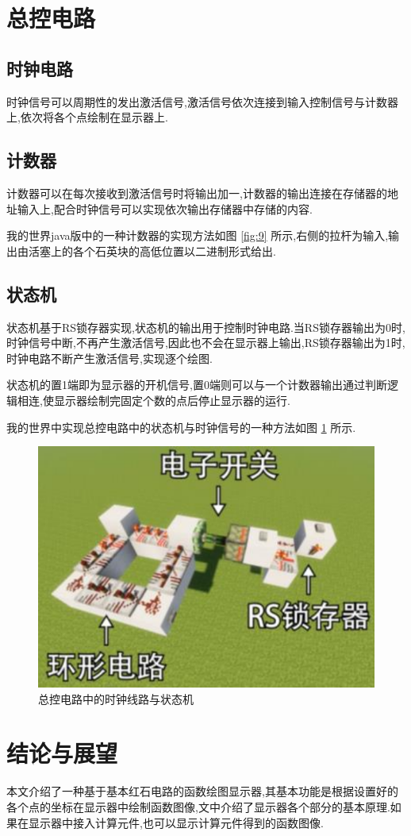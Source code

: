 \documentclass[UTF8,12pt,punct=kaiming,fontset=none]{ctexart}
\begin{document}
    \section{总控电路}
    \subsection{时钟电路}
    时钟信号可以周期性的发出激活信号,激活信号依次连接到输入控制信号与计数器上,依次将各个点绘制在显示器上.

    \subsection{计数器}
    计数器可以在每次接收到激活信号时将输出加一,计数器的输出连接在存储器的地址输入上,配合时钟信号可以实现依次输出存储器中存储的内容.
    
    我的世界java版中的一种计数器的实现方法如图 \ref{fig:9} 所示,右侧的拉杆为输入,输出由活塞上的各个石英块的高低位置以二进制形式给出.

    \subsection{状态机}
    状态机基于RS锁存器实现,状态机的输出用于控制时钟电路.当RS锁存器输出为0时,时钟信号中断,不再产生激活信号,因此也不会在显示器上输出,RS锁存器输出为1时,时钟电路不断产生激活信号,实现逐个绘图.
    
    状态机的置1端即为显示器的开机信号,置0端则可以与一个计数器输出通过判断逻辑相连,使显示器绘制完固定个数的点后停止显示器的运行.
    
    我的世界中实现总控电路中的状态机与时钟信号的一种方法如图 \ref{fig:10} 所示.

    \begin{figure}[H]
        \centering
        \includegraphics[width=0.25\linewidth]{figures/10.png}
        \caption{总控电路中的时钟线路与状态机}
        \label{fig:10}
    \end{figure}

    \section{结论与展望}
    本文介绍了一种基于基本红石电路的函数绘图显示器,其基本功能是根据设置好的各个点的坐标在显示器中绘制函数图像,文中介绍了显示器各个部分的基本原理.如果在显示器中接入计算元件,也可以显示计算元件得到的函数图像.
\end{document}
